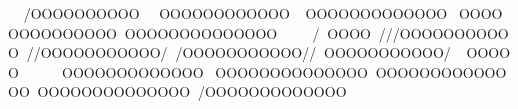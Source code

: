         / O O O O O O O O O O      O O O O O O O O O O O O     O O O O O O O O O O O O O    O O O O O O O O O O O O O O   O O O O O O O O O O O O O O          /   O O O O   / / / O O O O O O O O O O O   / / O O O O O O O O O O O /   / O O O O O O O O O O O / /   O O O O O O O O O O O /     O O O O O            O O O O O O O O O O O O O    O O O O O O O O O O O O O O   O O O O O O O O O O O O O O   O O O O O O O O O O O O O O   / O O O O O O O O O O O O O                                                                                                                                                                                                                                                                 